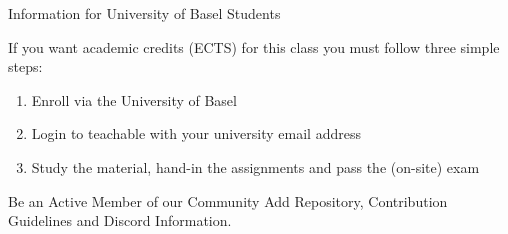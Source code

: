 \documentclass[handout]{beamer}
\begin{document}
\begin{frame}{Information for University of Basel Students}

If you want academic credits (ECTS) for this class you must follow three simple steps:
\vspace{0.5em}

	\begin{enumerate}
		\item<2-> Enroll via the University of Basel
		\item<3-> Login to teachable with your university email address
		\item<4-> Study the material, hand-in the assignments and pass the (on-site) exam
	\end{enumerate}
\vspace{1em}
	
\end{frame}

\begin{frame}{Be an Active Member of our Community}
	Add Repository, Contribution Guidelines and Discord Information.

\end{frame}
\end{document}
